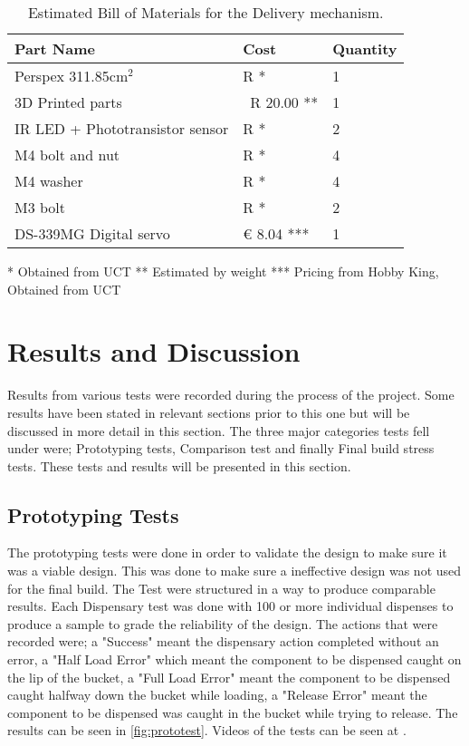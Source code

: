 \documentclass[a4paper,11pt]{article}
\numberwithin{figure}{section}
\numberwithin{table}{section}
\begin{document}
	\begin{table}[ht]
	\centering		
	\begin{tabular}{| m{8cm} | m{4cm}| m{3cm} |}
	\hline
	\textbf{Part Name} & \textbf{Cost} & \textbf{Quantity} \\
	\hline
	Perspex 311.85cm$^2$ & R * & 1 \\
	\hline
	3D Printed parts & ~R 20.00 ** & 1 \\
	\hline
	IR LED + Phototransistor sensor & R * & 2 \\
	\hline
	M4 bolt and nut & R * & 4 \\
	\hline 
	M4 washer & R * & 4 \\
	\hline	
	M3 bolt & R * & 2 \\
	\hline
	DS-339MG Digital servo & \euro{} 8.04 *** & 1 \\
	\hline
	\end{tabular}
	
	 * Obtained from UCT
	 ** Estimated by weight
	 *** Pricing from Hobby King, Obtained from UCT
	\caption{Estimated Bill of Materials for the Delivery mechanism. \label{tab:bomdel}}
	\end{table}	
	
\newpage

\section{Results and Discussion}
Results from various tests were recorded during the process of the project. Some results have been stated in relevant sections prior to this one but will be discussed in more detail in this section. The three major categories tests fell under were; Prototyping tests, Comparison test and finally Final build stress tests. These tests and results will be presented in this section.

\subsection{Prototyping Tests}

The prototyping tests were done in order to validate the design to make sure it was a viable design. This was done to make sure a ineffective design was not used for the final build. The Test were structured in a way to produce comparable results. Each Dispensary test was done with 100 or more individual dispenses to produce a sample to grade the reliability of the design. The actions that were recorded were; a "Success" meant the dispensary action completed without an error, a "Half Load Error" which meant the component to be dispensed caught on the lip of the bucket, a "Full Load Error" meant the component to be dispensed caught halfway down the bucket while loading, a "Release Error" meant the component to be dispensed was caught in the bucket while trying to release. The results can be seen in \autoref{fig:prototest}. Videos of the tests can be seen at \cite{verttest1p1,verttest1p2,vertv2,newhor}.
\end{document}
